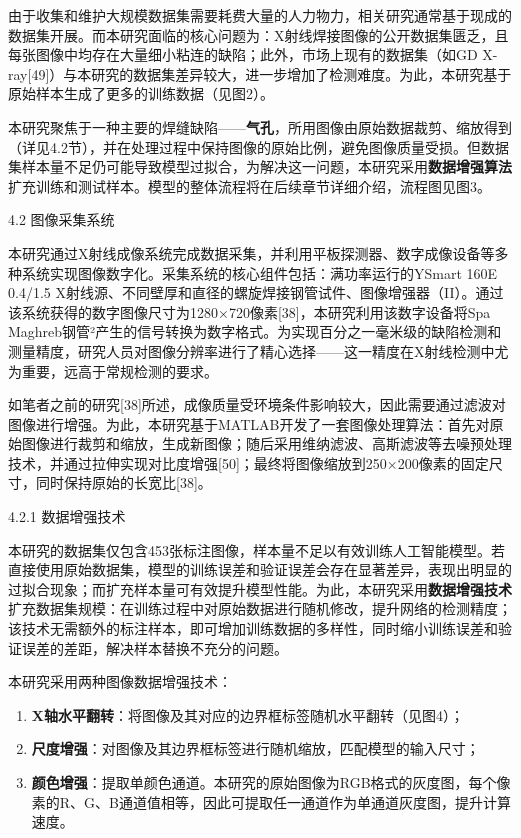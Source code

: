 由于收集和维护大规模数据集需要耗费大量的人力物力，相关研究通常基于现成的数据集开展。而本研究面临的核心问题为：X射线焊接图像的公开数据集匮乏，且每张图像中均存在大量细小粘连的缺陷；此外，市场上现有的数据集（如GD
X-ray{[}49{]}）与本研究的数据集差异较大，进一步增加了检测难度。为此，本研究基于原始样本生成了更多的训练数据（见图2）。

本研究聚焦于一种主要的焊缝缺陷------\textbf{气孔}，所用图像由原始数据裁剪、缩放得到（详见4.2节），并在处理过程中保持图像的原始比例，避免图像质量受损。但数据集样本量不足仍可能导致模型过拟合，为解决这一问题，本研究采用\textbf{数据增强算法}扩充训练和测试样本。模型的整体流程将在后续章节详细介绍，流程图见图3。

4.2 图像采集系统

本研究通过X射线成像系统完成数据采集，并利用平板探测器、数字成像设备等多种系统实现图像数字化。采集系统的核心组件包括：满功率运行的YSmart
160E 0.4/1.5
X射线源、不同壁厚和直径的螺旋焊接钢管试件、图像增强器（II）。通过该系统获得的数字图像尺寸为1280×720像素{[}38{]}，本研究利用该数字设备将Spa
Maghreb钢管²产生的信号转换为数字格式。为实现百分之一毫米级的缺陷检测和测量精度，研究人员对图像分辨率进行了精心选择------这一精度在X射线检测中尤为重要，远高于常规检测的要求。

如笔者之前的研究{[}38{]}所述，成像质量受环境条件影响较大，因此需要通过滤波对图像进行增强。为此，本研究基于MATLAB开发了一套图像处理算法：首先对原始图像进行裁剪和缩放，生成新图像；随后采用维纳滤波、高斯滤波等去噪预处理技术，并通过拉伸实现对比度增强{[}50{]}；最终将图像缩放到250×200像素的固定尺寸，同时保持原始的长宽比{[}38{]}。

4.2.1 数据增强技术

本研究的数据集仅包含453张标注图像，样本量不足以有效训练人工智能模型。若直接使用原始数据集，模型的训练误差和验证误差会存在显著差异，表现出明显的过拟合现象；而扩充样本量可有效提升模型性能。为此，本研究采用\textbf{数据增强技术}扩充数据集规模：在训练过程中对原始数据进行随机修改，提升网络的检测精度；该技术无需额外的标注样本，即可增加训练数据的多样性，同时缩小训练误差和验证误差的差距，解决样本替换不充分的问题。

本研究采用两种图像数据增强技术：

\begin{enumerate}
	\def\labelenumi{\arabic{enumi}.}
	\item
	\textbf{X轴水平翻转}：将图像及其对应的边界框标签随机水平翻转（见图4）；
	\item
	\textbf{尺度增强}：对图像及其边界框标签进行随机缩放，匹配模型的输入尺寸；
	\item
	\textbf{颜色增强}：提取单颜色通道。本研究的原始图像为RGB格式的灰度图，每个像素的R、G、B通道值相等，因此可提取任一通道作为单通道灰度图，提升计算速度。
\end{enumerate}

